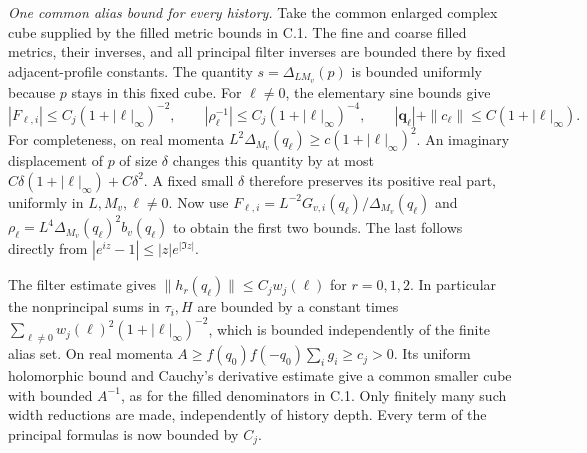\documentclass[11pt,reqno]{amsart}
\numberwithin{equation}{section}
\theoremstyle{definition}
\theoremstyle{remark}
\begin{document}
\smallskip\noindent
\emph{One common alias bound for every history.}
Take the common enlarged complex cube supplied by the filled
metric bounds in C.1. The fine and coarse filled metrics,
their inverses, and all principal filter inverses are bounded
there by fixed adjacent-profile constants. The quantity
\(s=\Delta_{LM_v}(p)\) is bounded uniformly because \(p\)
stays in this fixed cube. For \(\ell\ne0\), the elementary
sine bounds give
\begin{equation}
 |F_{\ell,i}|\le C_j(1+|\ell|_\infty)^{-2},\qquad
 |\rho_\ell^{-1}|\le C_j(1+|\ell|_\infty)^{-4},\qquad
 |\mathbf q_\ell|+\|c_\ell\|\le C(1+|\ell|_\infty).
 \label{eq:calibration-nonprincipal-prices}
\end{equation}
For completeness, on real momenta
\(L^2\Delta_{M_v}(q_\ell)\ge c(1+|\ell|_\infty)^2\).
An imaginary displacement of \(p\) of size \(\delta\)
changes this quantity by at most
\(C\delta(1+|\ell|_\infty)+C\delta^2\).
A fixed small \(\delta\) therefore preserves its positive
real part, uniformly in \(L,M_v,\ell\ne0\). Now use
\(F_{\ell,i}=L^{-2}G_{v,i}(q_\ell)/\Delta_{M_v}(q_\ell)\)
and
\(\rho_\ell=L^4\Delta_{M_v}(q_\ell)^2b_v(q_\ell)\)
to obtain the first two bounds. The last follows directly
from \(|e^{iz}-1|\le |z|e^{|\Im z|}\).

The filter estimate gives \(\|h_r(q_\ell)\|\le C_jw_j(\ell)\)
for \(r=0,1,2\). In particular the nonprincipal sums in
\(\tau_i,H\) are bounded by a constant times
\(\sum_{\ell\ne0}w_j(\ell)^2(1+|\ell|_\infty)^{-2}\),
which is bounded independently of the finite alias set.
On real momenta
\(A\ge f(q_0)f(-q_0)\sum_i g_i\ge c_j>0\).
Its uniform holomorphic bound and Cauchy's derivative
estimate give a common smaller cube with bounded \(A^{-1}\),
as for the filled denominators in C.1. Only finitely many
such width reductions are made, independently of history
depth. Every term of the principal formulas is now bounded
by \(C_j\).
\end{document}

